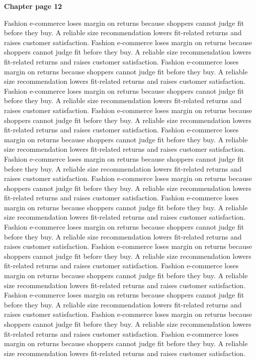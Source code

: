 \documentclass[a4paper,11pt]{article}
\begin{document}
{\headfont\bfseries\Large Chapter page 12}\par\medskip
Fashion e-commerce loses margin on returns because shoppers cannot judge fit before they buy. A reliable size recommendation lowers fit-related returns and raises customer satisfaction. Fashion e-commerce loses margin on returns because shoppers cannot judge fit before they buy. A reliable size recommendation lowers fit-related returns and raises customer satisfaction. Fashion e-commerce loses margin on returns because shoppers cannot judge fit before they buy. A reliable size recommendation lowers fit-related returns and raises customer satisfaction. Fashion e-commerce loses margin on returns because shoppers cannot judge fit before they buy. A reliable size recommendation lowers fit-related returns and raises customer satisfaction. Fashion e-commerce loses margin on returns because shoppers cannot judge fit before they buy. A reliable size recommendation lowers fit-related returns and raises customer satisfaction. 
Fashion e-commerce loses margin on returns because shoppers cannot judge fit before they buy. A reliable size recommendation lowers fit-related returns and raises customer satisfaction. Fashion e-commerce loses margin on returns because shoppers cannot judge fit before they buy. A reliable size recommendation lowers fit-related returns and raises customer satisfaction. Fashion e-commerce loses margin on returns because shoppers cannot judge fit before they buy. A reliable size recommendation lowers fit-related returns and raises customer satisfaction. Fashion e-commerce loses margin on returns because shoppers cannot judge fit before they buy. A reliable size recommendation lowers fit-related returns and raises customer satisfaction. Fashion e-commerce loses margin on returns because shoppers cannot judge fit before they buy. A reliable size recommendation lowers fit-related returns and raises customer satisfaction. 
Fashion e-commerce loses margin on returns because shoppers cannot judge fit before they buy. A reliable size recommendation lowers fit-related returns and raises customer satisfaction. Fashion e-commerce loses margin on returns because shoppers cannot judge fit before they buy. A reliable size recommendation lowers fit-related returns and raises customer satisfaction. Fashion e-commerce loses margin on returns because shoppers cannot judge fit before they buy. A reliable size recommendation lowers fit-related returns and raises customer satisfaction. Fashion e-commerce loses margin on returns because shoppers cannot judge fit before they buy. A reliable size recommendation lowers fit-related returns and raises customer satisfaction. Fashion e-commerce loses margin on returns because shoppers cannot judge fit before they buy. A reliable size recommendation lowers fit-related returns and raises customer satisfaction. \newpage
\end{document}
